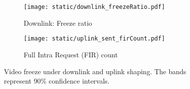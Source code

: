 \begin{figure}[t]
    \centering
    \begin{subfigure}[t]{0.4\textwidth}      
        \texttt{[image: static/downlink\_freezeRatio.pdf]}
        \caption{Downlink: Freeze ratio}
 		\label{subfig:downlink_freeze_ratio}
    \end{subfigure}
	\begin{subfigure}[t]{0.4\textwidth}   
        \centering
        \texttt{[image: static/uplink\_sent\_firCount.pdf]}
    \caption{Full Intra Request (FIR) count}
    \label{subfig:uplink_fir}
    \end{subfigure}%
	\caption{Video freeze under downlink and uplink shaping. The bands represent 90\% confidence intervals.%
	}
	\label{fig:video_freeze}
\end{figure}







